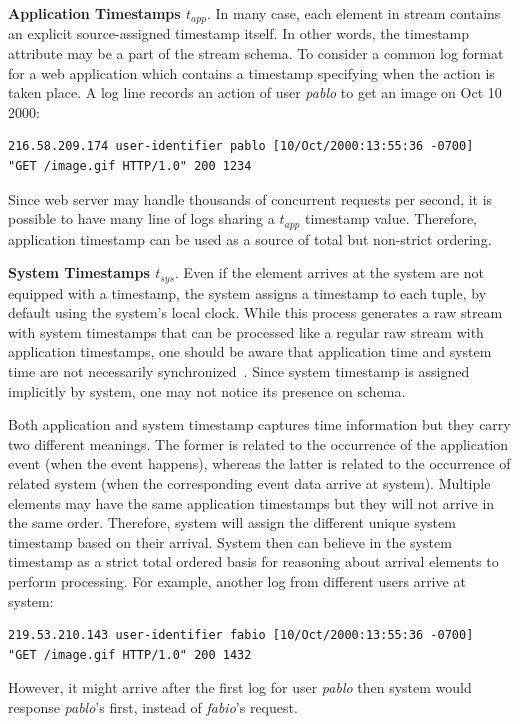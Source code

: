 \textbf{Application Timestamps $t_{app}$}. In many case, each element in stream contains an explicit source-assigned timestamp itself. In other words, the timestamp attribute may be a part of the stream schema. To consider  a common log format for a web application which contains a timestamp specifying when the action is taken place. 
A log line records an action of user \textit{pablo} to get an image on Oct 10 2000:
\begin{verbatim}
216.58.209.174 user-identifier pablo [10/Oct/2000:13:55:36 -0700] 
"GET /image.gif HTTP/1.0" 200 1234
\end{verbatim}
Since web server may handle thousands of concurrent requests per second, it is possible to have many line of logs sharing a $t_{app}$ timestamp value. Therefore, application timestamp can be used as a source of total but non-strict ordering.

\textbf{System Timestamps $t_{sys}$}. Even if the element arrives at the system are not equipped with a timestamp, the system assigns a timestamp to each tuple, by default using the system’s local clock. While this process generates a raw stream with system timestamps that can be processed like a regular raw stream with application timestamps, one should be aware that application time and system time are not necessarily synchronized~\citep{Kramer:2009}. Since system timestamp is assigned implicitly by system, one may not notice its presence on schema. 


Both application and system timestamp captures time information but they carry two different meanings. The former is related to the occurrence of the application event (when the event happens), whereas the latter is related to the occurrence of related system (when the corresponding event data arrive at system). Multiple elements may have the same application timestamps but they will not arrive in the same order. Therefore, system will assign the different unique system timestamp based on their arrival. System then can believe in the system timestamp as a strict total ordered basis for reasoning about arrival elements to perform processing. For example, another log from different users arrive at system:
\begin{verbatim}
219.53.210.143 user-identifier fabio [10/Oct/2000:13:55:36 -0700] 
"GET /image.gif HTTP/1.0" 200 1432
\end{verbatim}
However, it might arrive after the first log for user \textit{pablo} then system would response \textit{pablo}'s first, instead of \textit{fabio}'s request.

